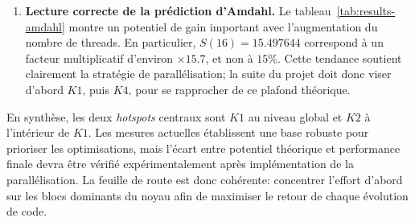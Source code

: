 \begin{enumerate}[leftmargin=*]
    \item \textbf{Lecture correcte de la prédiction d'Amdahl.}
    Le tableau~\ref{tab:results-amdahl} montre un potentiel de gain important avec l'augmentation
    du nombre
    de threads. En particulier, \(S(16)=15.497644\) correspond à un facteur multiplicatif
    d'environ \(\times 15.7\), et non à \(15\%\). Cette tendance soutient clairement la
    stratégie de parallélisation; la suite du projet doit donc viser d'abord \(K1\), puis \(K4\),
    pour se rapprocher de ce plafond théorique.
\end{enumerate}

\noindent
En synthèse, les deux \textit{hotspots} centraux sont \(K1\) au niveau global et \(K2\) à
l'intérieur de \(K1\). Les mesures actuelles établissent une base robuste pour prioriser les
optimisations, mais l'écart entre potentiel théorique et performance finale devra être vérifié
expérimentalement après implémentation de la parallélisation. La feuille de route est donc
cohérente: concentrer l'effort d'abord sur les blocs dominants du noyau afin de maximiser le
retour de chaque évolution de code.
